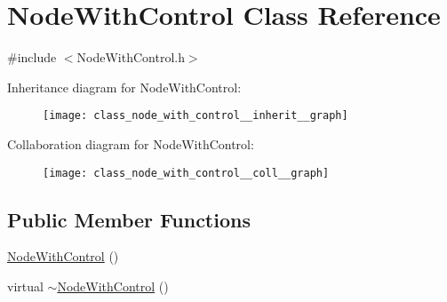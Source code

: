 \hypertarget{class_node_with_control}{}\section{Node\+With\+Control Class Reference}
\label{class_node_with_control}


{\ttfamily \#include $<$Node\+With\+Control.\+h$>$}



Inheritance diagram for Node\+With\+Control\+:
\nopagebreak
\begin{figure}[H]
\begin{center}
\leavevmode
\texttt{[image: class\_node\_with\_control\_\_inherit\_\_graph]}
\end{center}
\end{figure}


Collaboration diagram for Node\+With\+Control\+:
\nopagebreak
\begin{figure}[H]
\begin{center}
\leavevmode
\texttt{[image: class\_node\_with\_control\_\_coll\_\_graph]}
\end{center}
\end{figure}
\subsection*{Public Member Functions}
\begin{DoxyCompactItemize}
\item 
\hyperlink{class_node_with_control_ab0a223aca65e289aaee682dadfbefb5c}{Node\+With\+Control} ()
\item 
virtual \hyperlink{class_node_with_control_a6e752e38f0e233e7debfaaf4ae26fb2d}{$\sim$\+Node\+With\+Control} ()
\end{DoxyCompactItemize}
